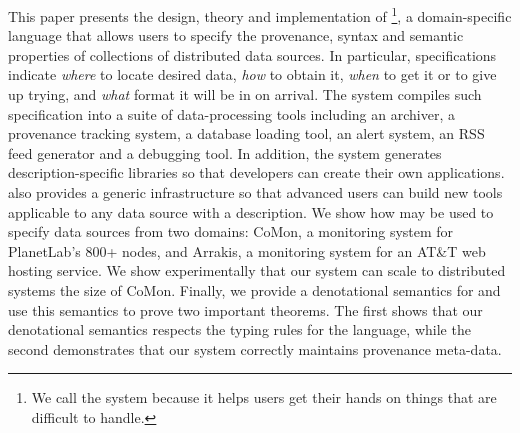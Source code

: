 
This paper presents the design, theory and implementation of
\padsd{}\footnote{We call the system \padsd{} because it helps users
get their hands on things that are difficult to handle.
}, a  domain-specific language that allows users to
specify the provenance, syntax and semantic properties of 
collections of distributed data sources.  In particular, \padsd{}
specifications indicate 
{\em where} to locate desired data, {\em how} to obtain it, {\em
when} to get it or to give up trying, and {\em what}
format it will be in on arrival.  The \padsd{} system compiles such
specification into a suite of data-processing tools including 
an archiver, a provenance tracking system, a database loading tool, 
an alert system, an RSS feed generator and a
debugging tool.  In addition, the system generates description-specific
libraries so that developers can create their
own applications. \padsd{} also provides a generic infrastructure
so that advanced users can build new tools applicable to any 
data source with a \padsd{} description.
We show how \padsd{} may be used to specify data sources from two domains:
CoMon, a monitoring system for PlanetLab's 800+ nodes, and Arrakis, a monitoring
system for an AT\&T web hosting service.  
We show experimentally that our system can scale to distributed
systems the size of CoMon.  
Finally, we provide a
denotational semantics for \padsd{} and use this semantics to prove two important
theorems.  The first shows that our denotational semantics respects the
typing rules for the language, while the second demonstrates that our 
system correctly maintains provenance meta-data.






